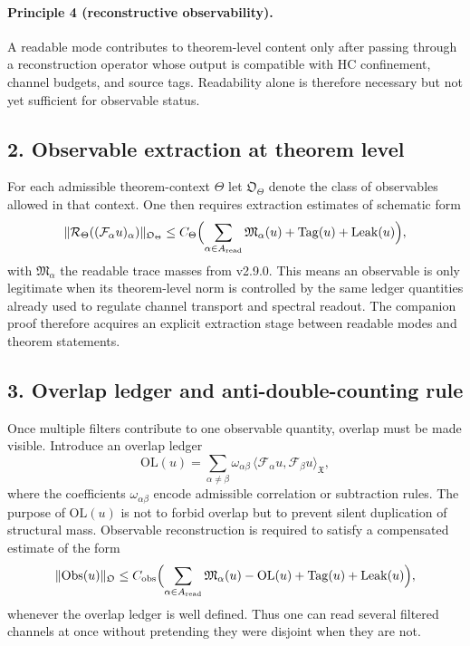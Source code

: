 \paragraph{Principle 4 (reconstructive observability).}
A readable mode contributes to theorem-level content only after passing through a
reconstruction operator whose output is compatible with HC confinement, channel
budgets, and source tags. Readability alone is therefore necessary but not yet
sufficient for observable status.

\subsection*{2. Observable extraction at theorem level}
For each admissible theorem-context $\Theta$ let $\mathfrak O_\Theta$ denote the class
of observables allowed in that context. One then requires extraction estimates of
schematic form
\[
\|\mathcal R_\Theta((\mathcal F_\alpha u)_\alpha)\|_{\mathfrak O_\Theta}
\le C_\Theta
\Bigl(
\sum_{\alpha\in A_{\mathrm{read}}} \mathfrak M_\alpha(u)
+ \mathrm{Tag}(u)+\mathrm{Leak}(u)
\Bigr),
\]
with $\mathfrak M_\alpha$ the readable trace masses from v2.9.0. This means an
observable is only legitimate when its theorem-level norm is controlled by the same
ledger quantities already used to regulate channel transport and spectral readout.
The companion proof therefore acquires an explicit extraction stage between readable
modes and theorem statements.

\subsection*{3. Overlap ledger and anti-double-counting rule}
Once multiple filters contribute to one observable quantity, overlap must be made
visible. Introduce an overlap ledger
\[
\mathrm{OL}(u)= \sum_{\alpha\neq\beta}
\omega_{\alpha\beta}\,\langle \mathcal F_\alpha u,\mathcal F_\beta u\rangle_{\mathfrak X},
\]
where the coefficients $\omega_{\alpha\beta}$ encode admissible correlation or
subtraction rules. The purpose of $\mathrm{OL}(u)$ is not to forbid overlap but to
prevent silent duplication of structural mass. Observable reconstruction is required
to satisfy a compensated estimate of the form
\[
\|\mathrm{Obs}(u)\|_{\mathfrak O}
\le C_{\mathrm{obs}}
\Bigl(
\sum_{\alpha\in A_{\mathrm{read}}} \mathfrak M_\alpha(u)
- \mathrm{OL}(u)
+ \mathrm{Tag}(u)+\mathrm{Leak}(u)
\Bigr),
\]
whenever the overlap ledger is well defined. Thus one can read several filtered
channels at once without pretending they were disjoint when they are not.

